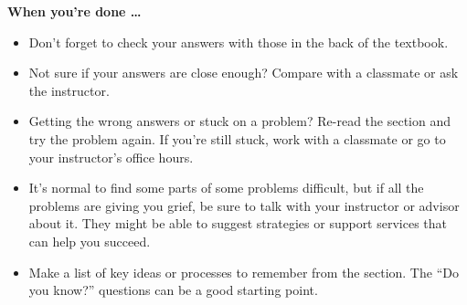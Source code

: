 \noindent \textbf{When you're done \ldots}

\begin{itemize}
\item Don't forget to check your answers with those in the back of the textbook. 
\item Not sure if your answers are close enough? Compare with a classmate or ask the instructor.  
\item Getting the wrong answers or stuck on a problem?  Re-read the section and try the problem again.   If you're still stuck, work with a classmate or go to your instructor's office hours.
\item It's normal to find some parts of some problems difficult, but if all the problems are giving you grief, be sure to talk with your instructor or advisor about it.  They might be able to suggest strategies or support services that can help you succeed.
\item Make a list of key ideas or processes to remember from the section.  The ``Do you know?'' questions can be a good starting point.
\end{itemize}



